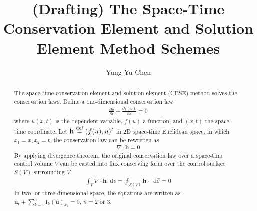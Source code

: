 \documentclass[11pt,dvips]{article}
\title{
%
(Drafting) The Space-Time Conservation Element and Solution Element Method
Schemes
%
}
\author{
%
Yung-Yu Chen
%
}
\numberwithin{equation}{section}
\newcommand{\defeq}{\ensuremath{\buildrel {\text{def}}\over{=}}}
\newcommand{\dif}{\mathop{}\!\mathrm{d}}
\begin{document}
\maketitle

\begin{abstract}

The space-time conservation element and solution element (CESE) method solves
the conservation laws\cite{lax_hyperbolic_1973}.  Define a one-dimensional
conservation law
\begin{align*}
  \frac{\partial u}{\partial t} + \frac{\partial f(u)}{\partial x} = 0
\end{align*}
where $u(x, t)$ is the dependent variable, $f(u)$ a function, and $(x, t)$ the
space-time coordinate.  Let $\mathbf{h}\defeq(f(u),u)^t$ in 2D space-time
Euclidean space, in which $x_1=x,x_2=t$, the conservation law can be rewritten
as
\begin{align*}
  \nabla\cdot\mathbf{h} = 0
\end{align*}
By applying divergence theorem, the original conservation law over a space-time
control volume $V$ can be casted into flux conserving form over the control
surface $S(V)$ surrounding $V$
\begin{align*}
  \int_V\nabla\cdot\mathbf{h}\dif v =
  \oint_{S(V)}\mathbf{h}\cdot\dif\hat{\sigma} = 0
\end{align*}
In two- or three-dimensional space, the equations are written as $\mathbf{u}_t
+ \sum_{k=1}^n \mathbf{f}_k(\mathbf{u})_{x_k} = 0$, $n = 2$ or $3$.


\end{abstract}
\end{document}
